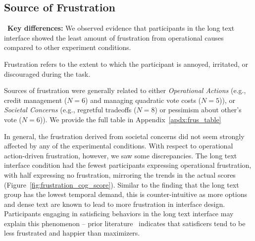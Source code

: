 
%


\subsection{Source of Frustration} 
\label{sec:frustration}

\begin{tldrbox}
   \faKey~\textbf{Key differences:} We observed evidence that participants in the long text interface showed the least amount of frustration from operational causes compared to other experiment conditions.%
\end{tldrbox}

Frustration refers to the extent to which the participant is annoyed, irritated, or discouraged during the task. 

Sources of frustration were generally related to either \textit{Operational Actions} (e.g., credit management ($N=6$) and managing quadratic vote costs ($N=5$)), or \textit{Societal Concerns} (e.g., regretful tradeoffs ($N=8$) or  pessimism about other's vote ($N=6$)). We provide the full table in Appendix~\ref{apdx:frus_table}

In general, the frustration derived from societal concerns did not seem strongly affected by any of the experimental conditions. With respect to operational action-driven frustration, however, we saw some discrepancies. The long text interface condition had the fewest participants expressing operational frustration, with half expressing no frustration, mirroring the trends in the actual scores (Figure~\ref{fig:frustration_cog_score}). Similar to the finding that the long text group has the lowest temporal demand, this is counter-intuitive as more options and dense text are known to lead to more frustration in interface design. Participants engaging in satisficing behaviors in the long text interface may explain this phenomenon -- prior literature~\cite{polmanWhyAreMaximizers2010, schwartzMaximizingSatisficingHappiness2002} indicates that satisficers tend to be less frustrated and happier than maximizers. 

